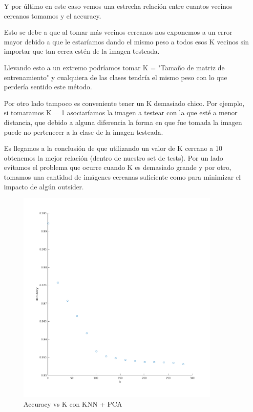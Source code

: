 Y por último en este caso vemos una estrecha relación entre cuantos vecinos cercanos tomamos y el accuracy.

Esto se debe a que al tomar más vecinos cercanos nos exponemos a un error mayor debido a que le estaríamos dando el mismo peso a todos esos K vecinos sin importar que tan cerca estén de la imagen testeada.

Llevando esto a un extremo podríamos tomar K = "Tamaño de matriz de entrenamiento" y cualquiera de las clases tendría el mismo peso con lo que perdería sentido este método.

Por otro lado tampoco es conveniente tener un K demasiado chico. Por ejemplo, si tomaramos K = 1 asociaríamos la imagen a testear con la que esté a menor distancia, que debido a alguna diferencia la forma en que fue tomada la imagen puede no pertenecer a la clase de la imagen testeada.

Es llegamos a la conclusión de que utilizando un valor de K cercano a 10 obtenemos la mejor relación (dentro de nuestro set de tests).
Por un lado evitamos el problema que ocurre cuando K es demasiado grande y por otro, tomamos una cantidad de imágenes cercanas suficiente como para minimizar el impacto de algún outsider.
\begin{figure}[H]
	\centering
	\includegraphics[width=0.9\textwidth]{img/k_pca_accu.png}
	\caption{Accuracy vs K con KNN + PCA}
	\label{fig:K vs Accuracy con KNN + PCA}
\end{figure}


